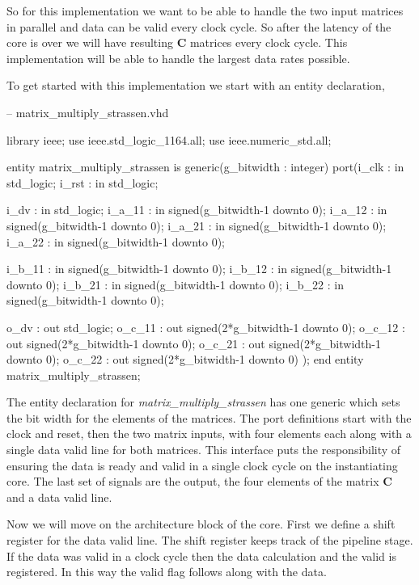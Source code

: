 So for this implementation we want to be able to handle the two input matrices in parallel and data can be valid every clock cycle. So after the latency of the core is over we will have resulting $\mathbf{C}$ matrices every clock cycle. This implementation will be able to handle the largest data rates possible. 

To get started with this implementation we start with an entity declaration,

\begin{VHDLlisting}[tabsize=2]
-- matrix_multiply_strassen.vhd

library ieee;
    use ieee.std_logic_1164.all;
    use ieee.numeric_std.all;
	
entity matrix_multiply_strassen is
    generic(g_bitwidth : integer)
    port(i_clk    : in    std_logic;
         i_rst    : in    std_logic;
		 
         i_dv     : in    std_logic;
         i_a_11   : in    signed(g_bitwidth-1 downto 0);
         i_a_12   : in    signed(g_bitwidth-1 downto 0);
         i_a_21   : in    signed(g_bitwidth-1 downto 0);
         i_a_22   : in    signed(g_bitwidth-1 downto 0);
		
         i_b_11   : in    signed(g_bitwidth-1 downto 0);
         i_b_12   : in    signed(g_bitwidth-1 downto 0);
         i_b_21   : in    signed(g_bitwidth-1 downto 0);
         i_b_22   : in    signed(g_bitwidth-1 downto 0);
		 
         o_dv     :   out std_logic;
         o_c_11   :   out signed(2*g_bitwidth-1 downto 0);
         o_c_12   :   out signed(2*g_bitwidth-1 downto 0);
         o_c_21   :   out signed(2*g_bitwidth-1 downto 0);
         o_c_22   :   out signed(2*g_bitwidth-1 downto 0)	
    );
end entity matrix_multiply_strassen;
\end{VHDLlisting}

The entity declaration for \emph{matrix\_multiply\_strassen} has one generic which sets the bit width for the elements of the matrices. The port definitions start with the clock and reset, then the two matrix inputs, with four elements each along with a single data valid line for both matrices. This interface puts the responsibility of ensuring the data is ready and valid in a single clock cycle on the instantiating core. The last set of signals are the output, the four elements of the matrix $\mathbf{C}$ and a data valid line. 

Now we will move on the architecture block of the core. First we define a shift register for the data valid line. The shift register keeps track of the pipeline stage. If the data was valid in a clock cycle then the data calculation and the valid is registered. In this way the valid flag follows along with the data. 

